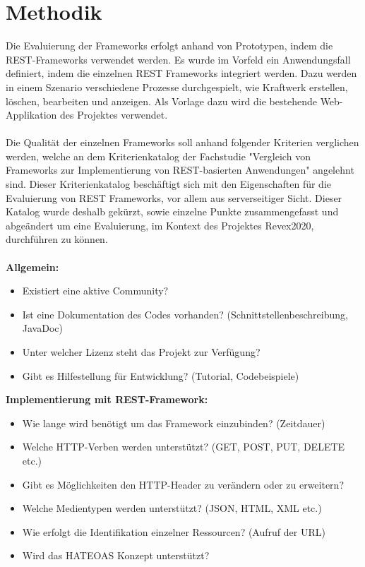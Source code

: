 \documentclass[a4paper,11pt,german,public]{INSOexpose}
\begin{document}
\section{Methodik}

Die Evaluierung der Frameworks erfolgt anhand von Prototypen, indem die REST-Frameworks verwendet werden. Es wurde im Vorfeld ein Anwendungsfall definiert, indem die einzelnen REST Frameworks integriert werden. Dazu werden in einem Szenario verschiedene Prozesse durchgespielt, wie Kraftwerk erstellen, löschen, bearbeiten und anzeigen. Als Vorlage dazu wird die bestehende Web-Applikation des Projektes verwendet.
\\\\
Die Qualität der einzelnen Frameworks soll anhand folgender Kriterien verglichen werden, welche an dem Kriterienkatalog der Fachstudie "Vergleich von Frameworks zur Implementierung von REST-basierten Anwendungen" \cite{vergleich13} angelehnt sind. Dieser Kriterienkatalog beschäftigt sich mit den Eigenschaften für die Evaluierung von REST Frameworks, vor allem aus serverseitiger Sicht. Dieser Katalog wurde deshalb gekürzt, sowie einzelne Punkte zusammengefasst und abgeändert um eine Evaluierung, im Kontext des Projektes Revex2020, durchführen zu können.
\\\\
\textbf{Allgemein:}
\begin{itemize}[label=$-$]
	\item Existiert eine aktive Community?
	\item Ist eine Dokumentation des Codes vorhanden? (Schnittstellenbeschreibung, JavaDoc)
	\item Unter welcher Lizenz steht das Projekt zur Verfügung?
	\item Gibt es Hilfestellung für Entwicklung? (Tutorial, Codebeispiele)
\end{itemize}

\textbf{Implementierung mit REST-Framework:}
\begin{itemize}[label=$-$]
	\item Wie lange wird benötigt um das Framework einzubinden?  (Zeitdauer)
	\item Welche HTTP-Verben werden unterstützt? (GET, POST, PUT, DELETE etc.)
	\item Gibt es Möglichkeiten den HTTP-Header zu verändern oder zu erweitern?
	\item Welche Medientypen werden unterstützt? (JSON, HTML, XML etc.)
	\item Wie erfolgt die Identifikation einzelner Ressourcen? (Aufruf der URL)
	\item Wird das HATEOAS Konzept unterstützt?
\end{itemize}
\end{document}
